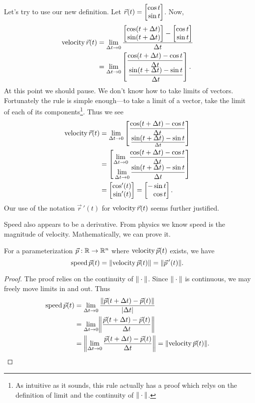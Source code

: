 Let's try to use our new definition.  Let $\vec r(t) = \mat{\cos t\\\sin t}$.  Now,
\begin{align*}
	\Vel \vec r(t) &=\lim_{\Delta t\to 0} \frac{\mat{\cos(t+\Delta t)\\\sin(t+\Delta t)} - \mat{\cos t\\\sin t}}{\Delta t}\\
	&=\lim_{\Delta t\to 0} \mat{
		\displaystyle\frac{\cos(t+\Delta t)-\cos t}{\Delta t} \\\displaystyle\frac{\sin(t+\Delta t)-\sin t}{\Delta t}
		}.
\end{align*}
At this point we should pause.  We don't know how to take limits of vectors.  Fortunately the rule
is simple enough---to take a limit of a vector, take the limit of each of its components\footnote{
	As intuitive as it sounds, this rule actually has a proof which relys on the definition
	of limit and the continuity of $\lVert\:\cdot\:\rVert$.
}.  Thus we see
\begin{align*}
	\Vel \vec r(t) 
	&=\lim_{\Delta t\to 0} \mat{
		\displaystyle\frac{\cos(t+\Delta t)-\cos t}{\Delta t} \\\frac{\displaystyle\sin(t+\Delta t)-\sin t}{\Delta t}}\\
	&=\mat{
		\displaystyle\lim_{\Delta t\to 0} \frac{\cos(t+\Delta t)-\cos t}{\Delta t} \\\displaystyle\lim_{\Delta t\to 0} \frac{\sin(t+\Delta t)-\sin t}{\Delta t}
		}\\
	&=\mat{\cos'(t)\\\sin'(t)} = \mat{-\sin t\\\cos t}.
\end{align*}
Our use of the notation $\vec r\,'(t)$ for $\operatorname{velocity} \vec r(t)$ seems further justified.

Speed also appears to be a derivative.  From physics we know speed is the magnitude of 
velocity.  Mathematically, we can prove it.
\begin{theorem}
	For a parameterization $\vec p:\mathbb{R}\to\mathbb{R}^n$ where $\operatorname{velocity} \vec p(t)$
	exists, we have
	\[
		\operatorname{speed} \vec p(t) = \lVert\operatorname{velocity} \vec p(t)\rVert = \lVert\vec p\,'(t)\rVert.
	\]
\end{theorem}
\begin{proof}
	The proof relies on the continuity of $\lVert\:\cdot\:\rVert$.  Since $\lVert\:\cdot\:\rVert$
	is continuous, we may freely move limits in and out.  Thus
	\begin{align*}
		\Speed \vec p(t) &= \lim_{\Delta t\to 0} \frac{\norm{\vec p(t+\Delta t) - \vec p(t)}}{\abs{\Delta t}}\\
		&= \lim_{\Delta t\to 0} \norm*{\frac{\vec p(t+\Delta t) - \vec p(t)}{\Delta t}}\\
		&=\norm*{\lim_{\Delta t\to 0} \frac{\vec p(t+\Delta t) - \vec p(t)}{\Delta t}}
		=\norm{\Vel \vec p(t)}.
	\end{align*}
\end{proof}

